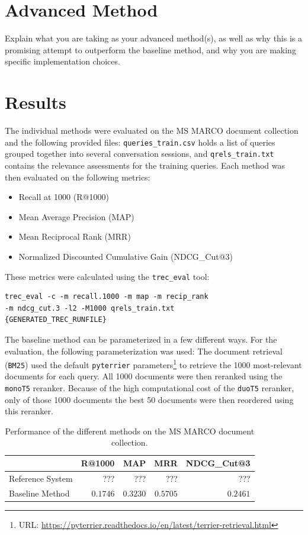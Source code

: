 \documentclass[sigconf]{acmart}
\begin{document}
\section{Advanced Method}\label{sec:advanced}
Explain what you are taking as your advanced method(s), as well as why this is a promising attempt to outperform the baseline method, and why you are making specific implementation choices.

\section{Results}\label{sec:results}
The individual methods were evaluated on the MS MARCO document collection and the following provided files: \texttt{queries\_train.csv} holds a list of queries grouped together into several conversation sessions, and \texttt{qrels\_train.txt} contains the relevance assessments for the training queries. Each method was then evaluated on the following metrics:
\begin{itemize}
	\item	Recall at 1000 (R@1000)
	\item	Mean Average Precision (MAP)
	\item	Mean Reciprocal Rank (MRR)
	\item	Normalized Discounted Cumulative Gain (NDCG\_Cut@3)
\end{itemize}
These metrics were calculated using the \texttt{trec\_eval} tool:
\begin{verbatim}
trec_eval -c -m recall.1000 -m map -m recip_rank
-m ndcg_cut.3 -l2 -M1000 qrels_train.txt
{GENERATED_TREC_RUNFILE}
\end{verbatim}

The baseline method can be parameterized in a few different ways. For the evaluation, the following parameterization was used: The document retrieval (\texttt{BM25}) used the default \texttt{pyterrier} parameters\footnote{URL: \url{https://pyterrier.readthedocs.io/en/latest/terrier-retrieval.html}} to retrieve the 1000 most-relevant documents for each query. All 1000 documents were then reranked using the \texttt{monoT5} reranker. Because of the high computational cost of the \texttt{duoT5} reranker, only of those 1000 documents the best 50 documents were then reordered using this reranker.

\begin{table}[h]
\begin{center}
	\caption{Performance of the different methods on the MS MARCO document collection.}
	\begin{tabular}{l|rrrr}
			& R@1000 & MAP & MRR & NDCG\_Cut@3 \\
		\hline
		Reference System & ??? & ??? & ??? & ??? \\
		Baseline Method & $0.1746$ & $0.3230$ & $0.5705$ & $0.2461$ \\
	\end{tabular}
	\label{table:1}
\end{center}
\end{table}
\end{document}
